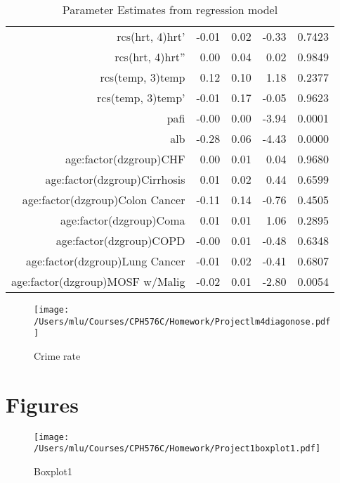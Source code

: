 \documentclass{article}
\begin{document}
\begin{Schunk}
\begin{table}[ht]
\begin{tabular}{rrrrr}
$$  rcs(hrt, 4)hrt' & -0.01 & 0.02 & -0.33 & 0.7423 \\ 
  rcs(hrt, 4)hrt'' & 0.00 & 0.04 & 0.02 & 0.9849 \\ 
  rcs(temp, 3)temp & 0.12 & 0.10 & 1.18 & 0.2377 \\ 
  rcs(temp, 3)temp' & -0.01 & 0.17 & -0.05 & 0.9623 \\ 
  pafi & -0.00 & 0.00 & -3.94 & 0.0001 \\ 
  alb & -0.28 & 0.06 & -4.43 & 0.0000 \\ 
  age:factor(dzgroup)CHF & 0.00 & 0.01 & 0.04 & 0.9680 \\ 
  age:factor(dzgroup)Cirrhosis & 0.01 & 0.02 & 0.44 & 0.6599 \\ 
  age:factor(dzgroup)Colon Cancer & -0.11 & 0.14 & -0.76 & 0.4505 \\ 
  age:factor(dzgroup)Coma & 0.01 & 0.01 & 1.06 & 0.2895 \\ 
  age:factor(dzgroup)COPD & -0.00 & 0.01 & -0.48 & 0.6348 \\ 
  age:factor(dzgroup)Lung Cancer & -0.01 & 0.02 & -0.41 & 0.6807 \\ 
  age:factor(dzgroup)MOSF w/Malig & -0.02 & 0.01 & -2.80 & 0.0054 \\ 
   \hline
\end{tabular}
\caption{Parameter Estimates from regression model} 
\label{reg1}
\end{table}\end{Schunk}
          
           \begin{figure}[htb]
     \begin{center}
     \texttt{[image: /Users/mlu/Courses/CPH576C/Homework/Projectlm4diagonose.pdf]}
     \caption{Crime rate}
     \end{center}
     \end{figure}
      
     
     
     
\section{Figures}
\begin{figure}[htb]
     \begin{center}
     \texttt{[image: /Users/mlu/Courses/CPH576C/Homework/Project1boxplot1.pdf]}
     \caption{Boxplot1}
     \end{center}
     \end{figure}
     
\end{document}
